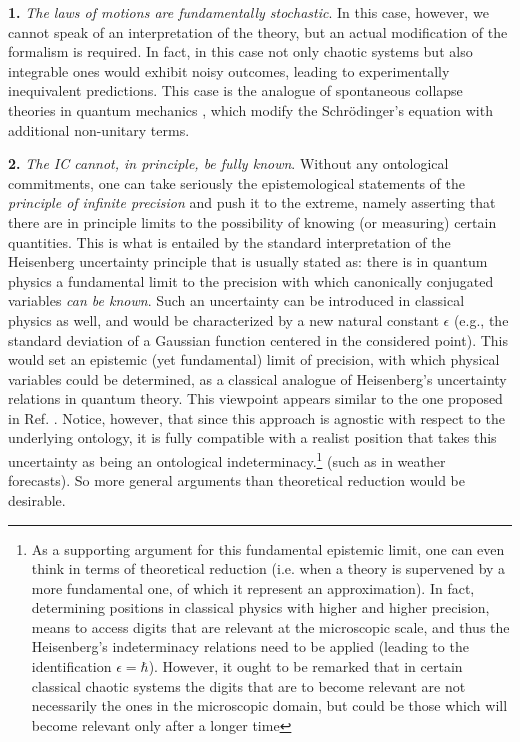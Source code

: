 \documentclass[12pt]{article}
\begin{document}
\textbf{1.} \emph{The laws of motions are fundamentally stochastic}. In this case, however, we cannot speak of an interpretation of the theory, but an actual modification of the formalism is required. In fact, in this case not only chaotic systems but also integrable ones would exhibit noisy outcomes, leading to experimentally inequivalent predictions. This case is the analogue of spontaneous collapse theories in quantum mechanics \cite{grw, gisincollapse, belljumps, cls}, which modify the Schr{\"o}dinger's equation with additional non-unitary terms.

\textbf{2.} \emph{The IC cannot, in principle, be fully known}. Without any ontological commitments, one can take seriously the epistemological statements of the \emph{principle of infinite precision} and push it to the extreme, namely asserting that there are in principle limits to the possibility of knowing (or measuring) certain quantities. This is what is entailed by the standard interpretation of the Heisenberg uncertainty principle that is usually stated as: there is in quantum physics a fundamental limit to the precision with which canonically conjugated variables \emph{can be known}.  Such an uncertainty can be introduced in classical physics as well, and would be characterized by a new natural constant $\epsilon$ (e.g., the standard deviation of a Gaussian function centered in the considered point). This would set an epistemic (yet fundamental) limit of precision, with which physical variables could be determined, as a classical analogue of  Heisenberg's uncertainty relations in quantum theory. This viewpoint appears similar to the one proposed in Ref. \cite{drossel}. Notice, however, that since this approach is agnostic with respect to the underlying ontology, it is fully compatible with a realist position that takes this uncertainty as being an ontological indeterminacy.\footnote{As a supporting argument for this fundamental epistemic limit, one can even think in terms of theoretical reduction (i.e. when a theory is supervened by a more fundamental one, of which it represent an approximation). In fact, determining positions in classical physics with higher and higher precision, means to access digits that are relevant at the microscopic scale, and thus the Heisenberg's indeterminacy relations need to be applied (leading to the identification $\epsilon=\hbar$). However, it ought to be remarked that in certain classical chaotic systems the digits that are to become relevant are not necessarily the ones in the microscopic domain, but could be those which will become relevant only after a longer time} (such as in weather forecasts). So more general arguments than theoretical reduction would be desirable.
\end{document}
